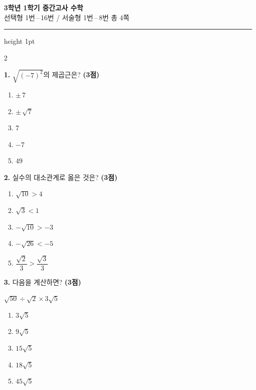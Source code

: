 \documentclass[a4paper,11pt]{article}
\newcommand{\choicenum}[1]{\textcircled{\small #1}}
\newcommand{\scorebox}[1]{\textbf{(#1점)}}
\newcommand{\qbox}[1]{%
  \begin{mdframed}[linewidth=0.8pt,innerleftmargin=6pt,innerrightmargin=6pt,innertopmargin=4pt,innerbottommargin=4pt]
  #1
  \end{mdframed}
}
\begin{document}
\begin{center}
{\large \textbf{3학년 1학기 중간고사 \quad 수학 \quad [B형]}}\\[2pt]
{\normalsize 선택형 1번\,--\,16번 \;/\; 서술형 1번\,--\,8번 \quad 총 4쪽}
\end{center}
\vspace{1mm}
\hrule height 1pt
\vspace{3mm}

\begin{multicols}{2}


\noindent\textbf{1.} $\sqrt{(-7)^{2}}$의 제곱근은? \scorebox{3}

\begin{enumerate}[label=\protect\choicenum{\arabic*},leftmargin=*,itemsep=0pt]
  \item $\pm\,7$
  \item $\pm\,\sqrt{7}$
  \item $7$
  \item $-7$
  \item $49$
\end{enumerate}

\vspace{3mm}

\noindent\textbf{2.} 실수의 대소관계로 옳은 것은? \scorebox{3}

\begin{enumerate}[label=\protect\choicenum{\arabic*},leftmargin=*,itemsep=0pt]
  \item $\sqrt{10} > 4$
  \item $\sqrt{3} < 1$
  \item $-\sqrt{10} > -3$
  \item $-\sqrt{26} < -5$
  \item $\dfrac{\sqrt{2}}{3} > \dfrac{\sqrt{3}}{3}$
\end{enumerate}

\vspace{3mm}

\noindent\textbf{3.} 다음을 계산하면? \scorebox{3}

\qbox{$\sqrt{50} \div \sqrt{2} \times 3\sqrt{5}$}

\begin{enumerate}[label=\protect\choicenum{\arabic*},leftmargin=*,itemsep=0pt]
  \item $3\sqrt{5}$
  \item $9\sqrt{5}$
  \item $15\sqrt{5}$
  \item $18\sqrt{5}$
  \item $45\sqrt{5}$
\end{enumerate}


\end{multicols}
\end{document}
